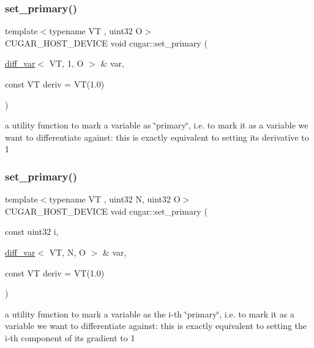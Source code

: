 \subsubsection{\texorpdfstring{set\+\_\+primary()}{set\_primary()}\hspace{0.1cm}{\footnotesize\ttfamily [1/2]}}
{\footnotesize\ttfamily template$<$typename VT , uint32 O$>$ \\
C\+U\+G\+A\+R\+\_\+\+H\+O\+S\+T\+\_\+\+D\+E\+V\+I\+CE void cugar\+::set\+\_\+primary (\begin{DoxyParamCaption}\item[{\hyperlink{structcugar_1_1diff__var}{diff\+\_\+var}$<$ VT, 1, O $>$ \&}]{var,  }\item[{const VT}]{deriv = {\ttfamily VT(1.0)} }\end{DoxyParamCaption})\hspace{0.3cm}{\ttfamily [inline]}}

a utility function to mark a variable as \char`\"{}primary\char`\"{}, i.\+e. to mark it as a variable we want to differentiate against\+: this is exactly equivalent to setting its derivative to 1 \mbox{\label{group___auto_diff_module_gaa768e489a1703901c058e46e319f2d3e}} 
\subsubsection{\texorpdfstring{set\+\_\+primary()}{set\_primary()}\hspace{0.1cm}{\footnotesize\ttfamily [2/2]}}
{\footnotesize\ttfamily template$<$typename VT , uint32 N, uint32 O$>$ \\
C\+U\+G\+A\+R\+\_\+\+H\+O\+S\+T\+\_\+\+D\+E\+V\+I\+CE void cugar\+::set\+\_\+primary (\begin{DoxyParamCaption}\item[{const uint32}]{i,  }\item[{\hyperlink{structcugar_1_1diff__var}{diff\+\_\+var}$<$ VT, N, O $>$ \&}]{var,  }\item[{const VT}]{deriv = {\ttfamily VT(1.0)} }\end{DoxyParamCaption})\hspace{0.3cm}{\ttfamily [inline]}}

a utility function to mark a variable as the i-\/th \char`\"{}primary\char`\"{}, i.\+e. to mark it as a variable we want to differentiate against\+: this is exactly equivalent to setting the i-\/th component of its gradient to 1 